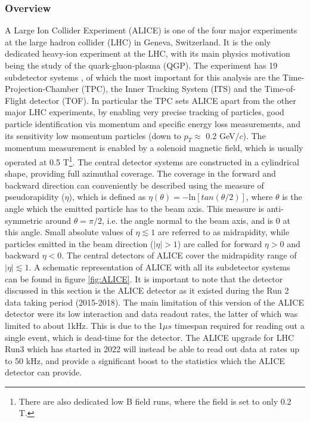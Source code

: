 \subsubsection{Overview}
A Large Ion Collider Experiment (ALICE) is one of the four major experiments at the large hadron collider (LHC) in Geneva, Switzerland. It is the only dedicated heavy-ion experiment at the LHC, with its main physics motivation being the study of the quark-gluon-plasma (QGP). The experiment has 19 subdetector systems \cite{}, of which the most important for this analysis are the Time-Projection-Chamber (TPC), the Inner Tracking System (ITS) and the Time-of-Flight detector (TOF). In particular the TPC sets ALICE apart from the other major LHC experiments, by enabling very precise tracking of particles, good particle identification via momentum and specific energy loss measurements, and its sensitivity low momentum particles (down to $p_T \approx $ 0.2 GeV/$c$). The momentum measurement is enabled by a solenoid magnetic field, which is usually operated at 0.5 T\footnote{There are also dedicated low B field runs, where the field is set to only 0.2 T.}. The central detector systems are constructed in a cylindrical shape, providing full azimuthal coverage. The coverage in the forward and backward direction can conveniently be described using the measure of pseudorapidity ($\eta$), which is defined as $\eta (\theta) = -\mathrm{ln}[tan(\theta/2)]$, where $\theta$ is the angle which the emitted particle has to the beam axis. This measure is anti-symmetric around $\theta = \pi/2$, i.e. the angle normal to the beam axis, and is 0 at this angle. Small absolute values of $\eta \lesssim 1$ are referred to as midrapidity, while particles emitted in the beam direction ($|\eta| > 1$) are called for forward $\eta >0$ and backward $\eta < 0$. The central detectors of ALICE cover the midrapidity range of $|\eta|\lesssim 1$. A schematic representation of ALICE with all its subdetector systems can be found in figure \ref{fig:ALICE}. It is important to note that the detector discussed in this section is the ALICE detector as it existed during the Run 2 data taking period (2015-2018). The main limitation of this version of the ALICE detector were its low interaction and data readout rates, the latter of which was limited to about 1kHz. This is due to the 1$\mu s$ timespan required for reading out a single event, which is dead-time for the detector. The ALICE upgrade for LHC Run3 which has started in 2022 will instead be able to read out data at rates up to 50 kHz, and provide a significant boost to the statistics which the ALICE detector can provide.

